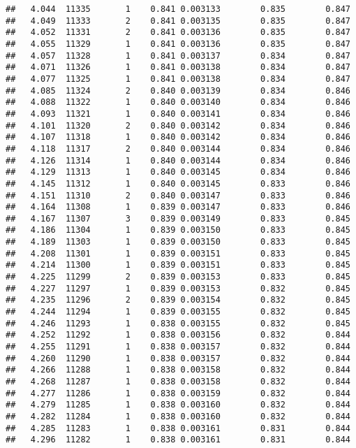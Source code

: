 \documentclass[
]{book}
\begin{document}
\begin{verbatim}
##   4.044  11335       1    0.841 0.003133        0.835        0.847
##   4.049  11333       2    0.841 0.003135        0.835        0.847
##   4.052  11331       2    0.841 0.003136        0.835        0.847
##   4.055  11329       1    0.841 0.003136        0.835        0.847
##   4.057  11328       1    0.841 0.003137        0.834        0.847
##   4.071  11326       1    0.841 0.003138        0.834        0.847
##   4.077  11325       1    0.841 0.003138        0.834        0.847
##   4.085  11324       2    0.840 0.003139        0.834        0.846
##   4.088  11322       1    0.840 0.003140        0.834        0.846
##   4.093  11321       1    0.840 0.003141        0.834        0.846
##   4.101  11320       2    0.840 0.003142        0.834        0.846
##   4.107  11318       1    0.840 0.003142        0.834        0.846
##   4.118  11317       2    0.840 0.003144        0.834        0.846
##   4.126  11314       1    0.840 0.003144        0.834        0.846
##   4.129  11313       1    0.840 0.003145        0.834        0.846
##   4.145  11312       1    0.840 0.003145        0.833        0.846
##   4.151  11310       2    0.840 0.003147        0.833        0.846
##   4.164  11308       1    0.839 0.003147        0.833        0.846
##   4.167  11307       3    0.839 0.003149        0.833        0.845
##   4.186  11304       1    0.839 0.003150        0.833        0.845
##   4.189  11303       1    0.839 0.003150        0.833        0.845
##   4.208  11301       1    0.839 0.003151        0.833        0.845
##   4.214  11300       1    0.839 0.003151        0.833        0.845
##   4.225  11299       2    0.839 0.003153        0.833        0.845
##   4.227  11297       1    0.839 0.003153        0.832        0.845
##   4.235  11296       2    0.839 0.003154        0.832        0.845
##   4.244  11294       1    0.839 0.003155        0.832        0.845
##   4.246  11293       1    0.838 0.003155        0.832        0.845
##   4.252  11292       1    0.838 0.003156        0.832        0.844
##   4.255  11291       1    0.838 0.003157        0.832        0.844
##   4.260  11290       1    0.838 0.003157        0.832        0.844
##   4.266  11288       1    0.838 0.003158        0.832        0.844
##   4.268  11287       1    0.838 0.003158        0.832        0.844
##   4.277  11286       1    0.838 0.003159        0.832        0.844
##   4.279  11285       1    0.838 0.003160        0.832        0.844
##   4.282  11284       1    0.838 0.003160        0.832        0.844
##   4.285  11283       1    0.838 0.003161        0.831        0.844
##   4.296  11282       1    0.838 0.003161        0.831        0.844

\end{verbatim}
\end{document}
